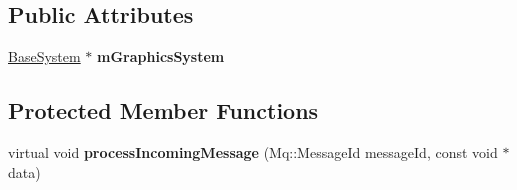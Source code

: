 \subsection*{Public Attributes}
\begin{DoxyCompactItemize}
\item 
\mbox{\label{class_common_1_1_logic_system_a0b7ac4ad3cc62da7681f649ad6e9823d}} 
\hyperlink{class_common_1_1_base_system}{Base\+System} $\ast$ {\bfseries m\+Graphics\+System}
\end{DoxyCompactItemize}
\subsection*{Protected Member Functions}
\begin{DoxyCompactItemize}
\item 
\mbox{\label{class_common_1_1_logic_system_a4495ecadf034103ad58deab6802543fa}} 
virtual void {\bfseries process\+Incoming\+Message} (Mq\+::\+Message\+Id message\+Id, const void $\ast$data)
\end{DoxyCompactItemize}
